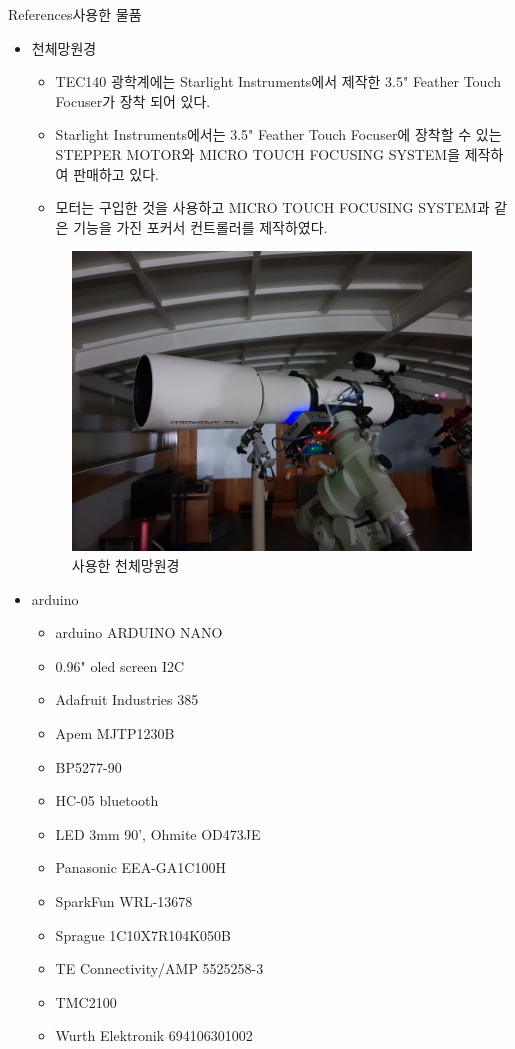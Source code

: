 \documentclass{gshs_poster_beamer}
\begin{document}
\begin{columns}[T]
\begin{posterbox}[colbacktitle=black,coltitle=white,colback=black!5]{References}{사용한 물품}
	\begin{itemize}
		\item 천체망원경
		\begin{itemize}
			\item TEC140 광학계에는 Starlight Instruments에서 제작한 3.5" Feather Touch Focuser가 장착 되어 있다.
			\item Starlight Instruments에서는 3.5" Feather Touch Focuser에 장착할 수 있는 STEPPER MOTOR와 MICRO TOUCH FOCUSING SYSTEM을 제작하여 판매하고 있다.
			\item 모터는 구입한 것을 사용하고 MICRO TOUCH FOCUSING SYSTEM과 같은 기능을 가진 포커서 컨트롤러를 제작하였다.
		\end{itemize}
	\begin{figure}[h]
		\centering
		\includegraphics[scale=0.4]{telescope}
		\caption{사용한 천체망원경}
		\label{fig:telescope}
	\end{figure}
		\item arduino
		\begin{itemize}
			\item arduino ARDUINO NANO
			\item 0.96" oled screen I2C
			\item Adafruit Industries 385
			\item Apem MJTP1230B
			\item BP5277-90
			\item HC-05 bluetooth
			\item LED 3mm 90', Ohmite OD473JE
			\item Panasonic EEA-GA1C100H
			\item SparkFun WRL-13678
			\item Sprague 1C10X7R104K050B
			\item TE Connectivity/AMP 5525258-3
			\item TMC2100
			\item Wurth Elektronik 694106301002
		\end{itemize}
	\end{itemize}
\end{posterbox}



\end{columns}
\end{document}
